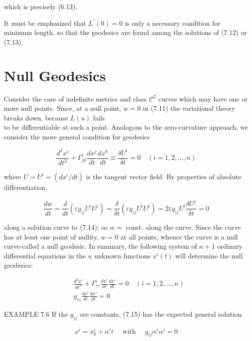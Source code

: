 \documentclass[10pt]{article}
\begin{document}
which is precisely (6.13).

It must be emphasized that $L^{\prime}(0)=0$ is only a necessary condition for minimum length, so that the geodesics are found among the solutions of (7.12) or (7.13).

\section*{Null Geodesics}
Consider the case of indefinite metrics and class $\mathscr{C}^{2}$ curves which may have one or more null points. Since, at a null point, $w=0$ in (7.11) the variational theory breaks down, because $L(u)$ fails\\
to be differentiable at such a point. Analogous to the zero-curvature approach, we consider the more general condition for geodesics


\begin{equation*}
\frac{d^{2} x^{i}}{d t^{2}}+\Gamma_{j k}^{i} \frac{d x^{j}}{d t} \frac{d x^{k}}{d t} \equiv \frac{\delta U^{i}}{\delta t}=0 \quad(i=1,2, \ldots, n) \tag{7.14}
\end{equation*}


where $U=U^{i}=\left(d x^{i} / d t\right)$ is the tangent vector field. By properties of absolute differentiation,

$$
\frac{d w}{d t}=\frac{d}{d t}\left(\varepsilon g_{i j} U^{i} U^{j}\right)=\frac{\delta}{\delta t}\left(\varepsilon g_{i j} U^{i} U^{j}\right)=2 \varepsilon g_{i j} U^{i} \frac{\delta U^{j}}{\delta t}=0
$$

along a solution curve to (7.14); so $w=$ const. along the curve. Since the curve has at least one point of nullity, $w=0$ at all points, whence the curve is a null curve-called a null geodesic. In summary, the following system of $n+1$ ordinary differential equations in the $n$ unknown functions $x^{i}(t)$ will determine the null geodesics:

$$
\begin{aligned}
& \frac{d^{2} x^{i}}{d t^{2}}+\Gamma_{r s}^{i} \frac{d x^{r}}{d t} \frac{d x^{s}}{d t}=0 \quad(i=1,2, \ldots, n) \\
& g_{r s} \frac{d x^{r}}{d t} \frac{d x^{s}}{d t}=0
\end{aligned}
$$

EXAMPLE 7.6 If the $g_{i j}$ are constants, (7.15) has the expected general solution

$$
x^{i}=x_{0}^{i}+\alpha^{i} t \quad \text { with } \quad g_{i j} \alpha^{i} \alpha^{j}=0
$$
\end{document}
